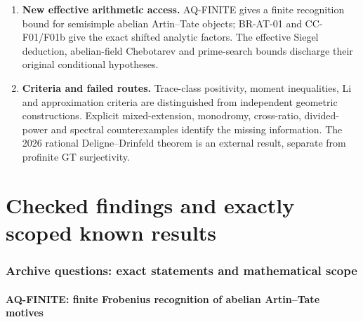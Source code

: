 \documentclass[11pt,a4paper]{article}
\theoremstyle{definition}\newtheorem{definition}[theorem]{Definition}
\theoremstyle{remark}\newtheorem{remark}[theorem]{Remark}
\begin{document}
\begin{enumerate}
inertia-invariant trace bounds. The universal stable curve has an explicit
geometric perverse decomposition, and its actual exit functor has the
proved right-Kan direct-image description. The linear theorem of cote
134-8 is established for all countable scalar rings, more generally
under a finite scalar pure-injective bound, or under either of two
finite-generation conditions, with the specified exact adjunction,
scalar compatibility and normalization retained. The unrestricted
large-ring case keeps its explicit counit gate.
\item \textbf{New effective arithmetic access.} AQ-FINITE gives a
finite recognition bound for semisimple abelian Artin--Tate objects;
BR-AT-01 and CC-F01/F01b give the exact shifted analytic factors.
The effective Siegel deduction, abelian-field Chebotarev and prime-search
bounds discharge their original conditional hypotheses.
\item \textbf{Criteria and failed routes.} Trace-class positivity,
moment inequalities, Li and approximation criteria are distinguished
from independent geometric constructions. Explicit mixed-extension,
monodromy, cross-ratio, divided-power and spectral counterexamples
identify the missing information. The 2026 rational Deligne--Drinfeld
theorem is an external result, separate from profinite GT surjectivity.
\end{enumerate}
\tableofcontents
\clearpage
\part{Checked findings and exactly scoped known results}

\section{Archive questions: exact statements and mathematical scope}

\subsection{AQ-FINITE: finite Frobenius recognition of abelian Artin--Tate motives}
\end{document}
